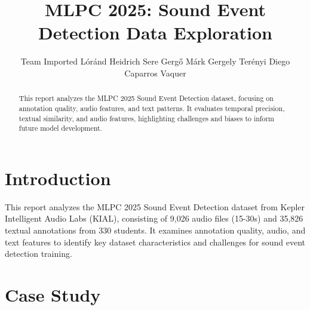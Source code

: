 \documentclass{article}
\title{MLPC 2025: Sound Event Detection Data Exploration}
\author{
  Team Imported \AND
  Lóránd Heidrich
  \And
  Sere Gergő Márk
  \And 
  Gergely Terényi
  \And 
  Diego Caparros Vaquer
}
\begin{document}
\maketitle

\begin{abstract}
This report analyzes the MLPC 2025 Sound Event Detection dataset, focusing on annotation quality, audio features, and text patterns. It evaluates temporal precision, textual similarity, and audio features, highlighting challenges and biases to inform future model development.
\end{abstract}

\section{Introduction}

This report analyzes the MLPC 2025 Sound Event Detection dataset from Kepler Intelligent Audio Labs (KIAL), consisting of 9,026 audio files (15-30s) and 35,826 textual annotations from 330 students. It examines annotation quality, audio, and text features to identify key dataset characteristics and challenges for sound event detection training.

\section{Case Study}
\label{sec:case_study}

\begin{table}[H]
  \caption{Conclusions}
  \label{tab:text_similarity}
  \centering
\end{table}
\end{document}
